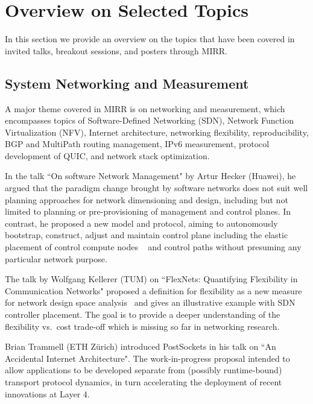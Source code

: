 \section{Overview on Selected Topics} \label{sec:content}

In this section we provide an overview on the topics that have been
covered in invited talks, breakout sessions, and posters through MIRR.

\subsection{System Networking and Measurement}

A major theme covered in MIRR is on networking and measurement, which
encompasses topics of Software-Defined Networking (SDN), Network Function
Virtualization (NFV), Internet architecture, networking flexibility, 
reproducibility, BGP and MultiPath routing management, IPv6 measurement,  
protocol development of QUIC, and network stack optimization. 


In the talk ``On software Network Management" by Artur Hecker (Huawei), 
he argued that
the paradigm change brought by software networks does not suit well planning
approaches for network dimensioning and design, including but not limited to
planning or pre-provisioning of management and control planes. In contrast, he
proposed a new model and protocol, aiming to autonomously
bootstrap, construct, adjust and maintain control plane including the elastic
placement of control compute nodes ~\cite{yliu:icc:2015} and control paths without
presuming any particular network purpose.

The talk by Wolfgang Kellerer (TUM) on ``FlexNets: Quantifying Flexibility in
Communication Networks" proposed a definition for flexibility as a
new measure for network design space analysis~\cite{wkellerer:infocom:2016}
and gives an illustrative example with \ac{SDN} controller placement.
The goal is to provide a deeper understanding of the
flexibility vs.\ cost trade-off which is missing so far in networking research.

Brian Trammell (ETH Zürich) introduced PostSockets \cite{draft-trammell-post-sockets}
in his talk on ``An Accidental Internet Architecture". The work-in-progress 
proposal intended to allow applications to be developed separate from (possibly
runtime-bound) transport protocol dynamics, in turn accelerating the
deployment of recent innovations at Layer 4.


